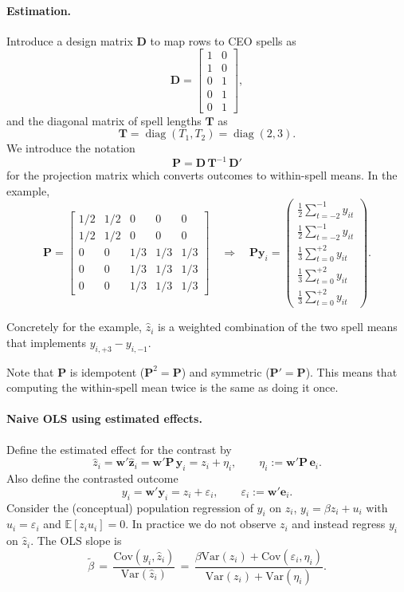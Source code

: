 \documentclass[11pt,a4paper]{article}
\newcommand{\Var}{\text{Var}}
\newcommand{\Cov}{\text{Cov}}
\begin{document}
\paragraph{Estimation.} Introduce a design matrix $\mathbf D$ to map rows to CEO spells as
\[
  \mathbf D = \begin{bmatrix}
    1 & 0\\
    1 & 0\\
    0 & 1\\
    0 & 1\\
    0 & 1
  \end{bmatrix},
\]
and the diagonal matrix of spell lengths $\mathbf T$ as
$$
  \mathbf T = \operatorname{diag}(T_1,T_2)=\operatorname{diag}(2,3).
$$
We introduce the notation
$$
  \mathbf P = \mathbf D\,\mathbf T^{-1}\,\mathbf D'
$$
for the projection matrix which converts outcomes to within-spell means. In the example,
\[
  \mathbf P = \begin{bmatrix}
    1/2 & 1/2 & 0 & 0 & 0\\
    1/2 & 1/2 & 0 & 0 & 0\\
    0 & 0 & 1/3 & 1/3 & 1/3\\
    0 & 0 & 1/3 & 1/3 & 1/3\\
    0 & 0 & 1/3 & 1/3 & 1/3
  \end{bmatrix}\quad\Rightarrow\quad
  \mathbf {Py}_i = 
  \begin{pmatrix}
  \frac12 \sum_{t=-2}^{-1} y_{it} \\
  \frac12 \sum_{t=-2}^{-1} y_{it} \\
  \frac13 \sum_{t=0}^{+2} y_{it}\\
  \frac13 \sum_{t=0}^{+2} y_{it}\\
  \frac13 \sum_{t=0}^{+2} y_{it}
  \end{pmatrix}.
\]

Concretely for the example, $\hat z_i$ is a weighted combination of the two spell means that implements $y_{i,+3}-y_{i,-1}$.

Note that $\mathbf P$ is idempotent ($\mathbf P^2=\mathbf P$) and symmetric ($\mathbf P'=\mathbf P$). This means that computing the within-spell mean twice is the same as doing it once.


\paragraph{Naive OLS using estimated effects.} Define the estimated effect for the contrast by
\[
  \hat z_i = \mathbf w'\hat{\mathbf z}_i = \mathbf w'\mathbf P\,\mathbf y_i = z_i + \eta_i,\qquad \eta_i:=\mathbf w'\mathbf P\,\mathbf e_i.
\]
Also define the contrasted outcome
\[
  y_i = \mathbf w'\mathbf y_i = z_i + \varepsilon_i,\qquad \varepsilon_i:=\mathbf w'\mathbf e_i.
\]
Consider the (conceptual) population regression of $y_i$ on $z_i$, $y_i=\beta z_i+u_i$ with $u_i=\varepsilon_i$ and $\mathbb E[z_i u_i]=0$. In practice we do not observe $z_i$ and instead regress $y_i$ on $\hat z_i$. The OLS slope is
\[
  \tilde\beta \,=\, \frac{\Cov(y_i,\hat z_i)}{\Var(\hat z_i)} \,=\, \frac{\beta\Var(z_i)+\Cov(\varepsilon_i,\eta_i)}{\Var(z_i)+\Var(\eta_i)}.
\]
 
\end{document}

